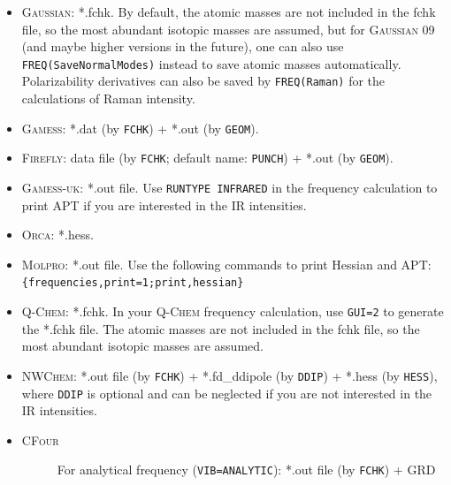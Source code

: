 \documentclass[12pt,english]{extarticle}
\begin{document}
\begin{itemize}
\item \textsc{Gaussian}: *.fchk. By default, the atomic masses are not included in the fchk file, so the most abundant isotopic masses are assumed, but for \textsc{Gaussian} 09 (and maybe higher versions in the future), one can also use \texttt{FREQ(SaveNormalModes)} instead to save atomic masses automatically. Polarizability derivatives can also be saved by \texttt{FREQ(Raman)} for the calculations of Raman intensity.
\item \textsc{Gamess}: *.dat (by \verb|FCHK|) + *.out (by \verb|GEOM|).
\item \textsc{Firefly}: data file (by \verb|FCHK|; default name: \verb|PUNCH|) + *.out (by \verb|GEOM|).
\item \textsc{Gamess-uk}: *.out file. Use \texttt{RUNTYPE INFRARED} in the frequency calculation to
print APT if you are interested in the IR intensities.
\item \textsc{Orca}: *.hess.
\item \textsc{Molpro}: *.out file. Use the following commands to print Hessian and APT: \\
\verb|{frequencies,print=1;print,hessian}|
\item \textsc{Q-Chem}: *.fchk. In your \textsc{Q-Chem} frequency calculation, use \texttt{GUI=2} to
generate the *.fchk file. The atomic masses are not included in the fchk
file, so the most abundant isotopic masses are assumed.
\item \textsc{NWChem}: *.out file (by \verb|FCHK|) + *.fd{\_}ddipole (by \verb|DDIP|) +
*.hess (by \verb|HESS|), where \verb|DDIP| is optional and can be
neglected if you are not interested in the IR intensities.
\item \textsc{CFour}
  \begin{description}
  \item[ ]For analytical frequency (\texttt{VIB=ANALYTIC}): *.out file (by \verb|FCHK|) + GRD

\end{description}
\end{itemize}
\end{document}
